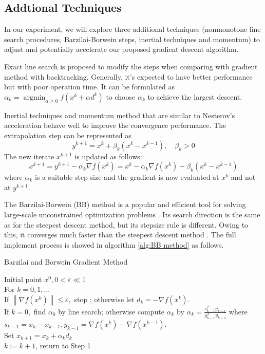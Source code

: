 \subsection{Addtional Techniques}
In our experiment, we will explore three additional techniques (nonmonotone line search procedures, Barzilai-Borwein steps, inertial techniques and momentum) to adjust and potentially accelerate our proposed gradient descent algorithm. 

Exact line search is proposed to modify the steps when comparing with gradient method with backtracking. Generally, it's expected to have better performance but with poor operation time. It can be formulated as $\alpha_{k}=\operatorname{argmin}_{\alpha \geq 0} f\left(x^{k}+\alpha d^{k}\right)$ to choose $\alpha_{k}$ to achieve the largest descent. 

Inertial techniques and momentum method that are similar to Nesterov’s acceleration behave well to improve the convergence performance. The extrapolation step can be represented as $$
y^{k+1}=x^{k}+\beta_{k}\left(x^{k}-x^{k-1}\right), \quad \beta_{k}>0
$$
The new iterate $x^{k+1}$ is updated as follows:
$$
x^{k+1}=y^{k+1}-\alpha_{k} \nabla f\left(x^{k}\right)=x^{k}-\alpha_{k} \nabla f\left(x^{k}\right)+\beta_{k}\left(x^{k}-x^{k-1}\right)
$$
where $\alpha_{k}$ is a suitable step size and the gradient is now evaluated at $x^{k}$ and not at $y^{k+1} $.

The Barzilai-Borwein (BB) method is a popular and efficient tool for solving large-scale unconstrained optimization problems \cite{raydan1997barzilai}. Its search direction is the same as for the steepest descent method, but its stepsize rule is different. Owing to this, it converges much faster than the steepest descent method \cite{burdakov2019stabilized}. The full implement process is showed in algorithm \ref{alg:BB method} as follows.

\begin{algorithm}[H]
  \caption{Barzilai and Borwein Gradient Method}
  \label{alg:BB method}
  \begin{algorithmic}[1]
  \REQUIRE
Initial point $x^{0},0<\varepsilon \ll 1 $ \\
  \STATE For $k=0,1, \ldots$ \\
  \STATE If $\left\|\nabla f\left(x^{k}\right)\right\| \leq \varepsilon,$ stop ; otherwise let $d_{k}=-\nabla f\left(x^{k}\right)$. \\
  \STATE If $k=0,$ find $\alpha_{0}$ by line search; otherwise compute $\alpha_{k}$ by 
  $
  \alpha_{k}=\frac{s_{k-1}^{T} y_{k-1}}{y_{k-1}^{T} y_{k-1}}
  $
  where $s_{k-1}=x_{k}-x_{k-1}, y_{k-1}=\nabla f\left(x^{k}\right)-\nabla f\left(x^{k-1}\right)$. \\
  \STATE Set $x_{k+1}=x_{k}+\alpha_{k} d_{k}$ \\
  \STATE $k:=k+1$, return to Step 1 \\
  \end{algorithmic}
\end{algorithm}





